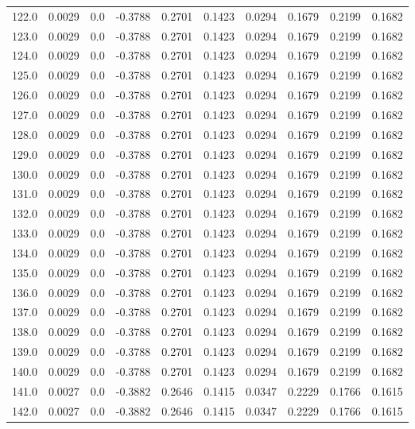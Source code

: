 \begin{longtable}{lrrrrrrrrr}
122.0 & 0.0029 & 0.0 & -0.3788 & 0.2701 & 0.1423 & 0.0294 & 0.1679 & 0.2199 & 0.1682 \\
123.0 & 0.0029 & 0.0 & -0.3788 & 0.2701 & 0.1423 & 0.0294 & 0.1679 & 0.2199 & 0.1682 \\
124.0 & 0.0029 & 0.0 & -0.3788 & 0.2701 & 0.1423 & 0.0294 & 0.1679 & 0.2199 & 0.1682 \\
125.0 & 0.0029 & 0.0 & -0.3788 & 0.2701 & 0.1423 & 0.0294 & 0.1679 & 0.2199 & 0.1682 \\
126.0 & 0.0029 & 0.0 & -0.3788 & 0.2701 & 0.1423 & 0.0294 & 0.1679 & 0.2199 & 0.1682 \\
127.0 & 0.0029 & 0.0 & -0.3788 & 0.2701 & 0.1423 & 0.0294 & 0.1679 & 0.2199 & 0.1682 \\
128.0 & 0.0029 & 0.0 & -0.3788 & 0.2701 & 0.1423 & 0.0294 & 0.1679 & 0.2199 & 0.1682 \\
129.0 & 0.0029 & 0.0 & -0.3788 & 0.2701 & 0.1423 & 0.0294 & 0.1679 & 0.2199 & 0.1682 \\
130.0 & 0.0029 & 0.0 & -0.3788 & 0.2701 & 0.1423 & 0.0294 & 0.1679 & 0.2199 & 0.1682 \\
131.0 & 0.0029 & 0.0 & -0.3788 & 0.2701 & 0.1423 & 0.0294 & 0.1679 & 0.2199 & 0.1682 \\
132.0 & 0.0029 & 0.0 & -0.3788 & 0.2701 & 0.1423 & 0.0294 & 0.1679 & 0.2199 & 0.1682 \\
133.0 & 0.0029 & 0.0 & -0.3788 & 0.2701 & 0.1423 & 0.0294 & 0.1679 & 0.2199 & 0.1682 \\
134.0 & 0.0029 & 0.0 & -0.3788 & 0.2701 & 0.1423 & 0.0294 & 0.1679 & 0.2199 & 0.1682 \\
135.0 & 0.0029 & 0.0 & -0.3788 & 0.2701 & 0.1423 & 0.0294 & 0.1679 & 0.2199 & 0.1682 \\
136.0 & 0.0029 & 0.0 & -0.3788 & 0.2701 & 0.1423 & 0.0294 & 0.1679 & 0.2199 & 0.1682 \\
137.0 & 0.0029 & 0.0 & -0.3788 & 0.2701 & 0.1423 & 0.0294 & 0.1679 & 0.2199 & 0.1682 \\
138.0 & 0.0029 & 0.0 & -0.3788 & 0.2701 & 0.1423 & 0.0294 & 0.1679 & 0.2199 & 0.1682 \\
139.0 & 0.0029 & 0.0 & -0.3788 & 0.2701 & 0.1423 & 0.0294 & 0.1679 & 0.2199 & 0.1682 \\
140.0 & 0.0029 & 0.0 & -0.3788 & 0.2701 & 0.1423 & 0.0294 & 0.1679 & 0.2199 & 0.1682 \\
141.0 & 0.0027 & 0.0 & -0.3882 & 0.2646 & 0.1415 & 0.0347 & 0.2229 & 0.1766 & 0.1615 \\
142.0 & 0.0027 & 0.0 & -0.3882 & 0.2646 & 0.1415 & 0.0347 & 0.2229 & 0.1766 & 0.1615 \\

\end{longtable}
